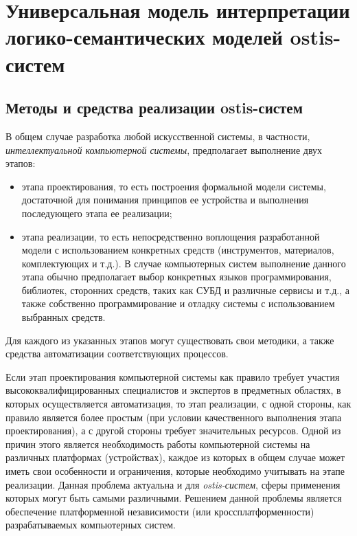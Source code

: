\chapter{Универсальная модель интерпретации логико-семантических моделей ostis-систем}
\label{chapter_interpreter}


\section{Методы и средства реализации ostis-систем}

В общем случае разработка любой искусственной системы, в частности, \textit{интеллектуальной компьютерной системы}, предполагает выполнение двух этапов:
\begin{itemize}
\item этапа проектирования, то есть построения формальной модели системы, достаточной для понимания принципов ее устройства и выполнения последующего этапа ее реализации;
\item этапа реализации, то есть непосредственно воплощения разработанной модели с использованием конкретных средств (инструментов, материалов, комплектующих и т.д.). В случае компьютерных систем выполнение данного этапа обычно предполагает выбор конкретных языков программирования, библиотек, сторонних средств, таких как СУБД и различные сервисы и т.д., а также собственно программирование и отладку системы с использованием выбранных средств.
\end{itemize}

Для каждого из указанных этапов могут существовать свои методики, а также средства автоматизации соответствующих процессов.

Если этап проектирования компьютерной системы как правило требует участия высококвалифицированных специалистов и экспертов в предметных областях, в которых осуществляется автоматизация, то этап реализации, с одной стороны, как правило является более простым (при условии качественного выполнения этапа проектирования), а с другой стороны требует значительных ресурсов. Одной из причин этого является необходимость работы компьютерной системы на различных платформах (устройствах), каждое из которых в общем случае может иметь свои особенности и ограничения, которые необходимо учитывать на этапе реализации. Данная проблема актуальна и для \textit{ostis-систем}, сферы применения которых могут быть самыми различными. Решением данной проблемы является обеспечение платформенной независимости (или кроссплатформенности) разрабатываемых компьютерных систем.

